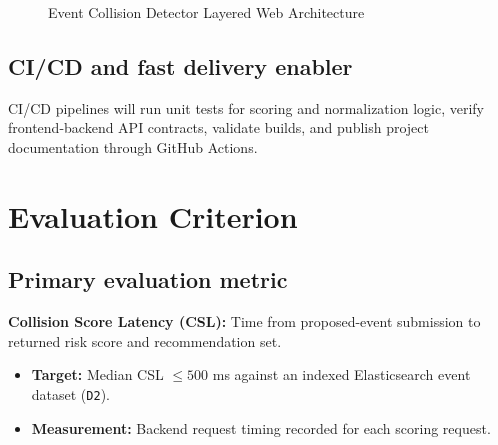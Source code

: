 \documentclass[12pt]{article}
\begin{document}
\begin{figure}[H]
\centering
{}
\caption{Event Collision Detector Layered Web Architecture}
\end{figure}

\subsection{CI/CD and fast delivery enabler}
CI/CD pipelines will run unit tests for scoring and normalization logic, verify frontend-backend API contracts, validate builds, and publish project documentation through GitHub Actions.

\section{Evaluation Criterion}
\subsection{Primary evaluation metric}
\textbf{Collision Score Latency (CSL):} Time from proposed-event submission to returned risk score and recommendation set.
\begin{itemize}[leftmargin=0.7cm]
\item \textbf{Target:} Median CSL $\leq 500$ ms against an indexed Elasticsearch event dataset (\texttt{D2}).
\item \textbf{Measurement:} Backend request timing recorded for each scoring request.
\end{itemize}
\end{document}
